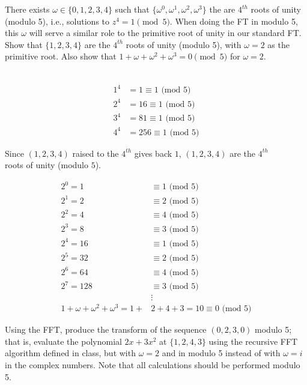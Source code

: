\documentclass[11pt]{article}
\begin{document}
\begin{subparts}
\subpart There exists $\omega \in \{0, 1, 2, 3, 4\}$ such that $\{\omega^0, \omega^1, \omega^2, \omega^3\}$ the are $4^{th}$ roots of unity (modulo 5), i.e., solutions to $z^4 = 1 \pmod 5$. When doing the FT in modulo 5, this $\omega$ will serve a similar role to the primitive root of unity in our standard FT. Show that $\{1,2,3,4\}$ are the $4^{th}$ roots of unity (modulo 5), with $\omega=2$ as the primitive root. Also show that $1+\omega + \omega^2 + \omega^3 = 0 \pmod 5$ for $\omega=2$.\\
\begin{solution}\\
    \begin{align*}
        1^4 &= 1 \equiv 1\text{ (mod } 5)\\
        2^4 &= 16 \equiv 1\text{ (mod } 5)\\
        3^4 &= 81 \equiv 1\text{ (mod } 5)\\
        4^4 &= 256 \equiv 1\text{ (mod } 5)
    \end{align*}
    \begin{center}
        Since $\left(1, 2, 3, 4\right)$ raised to the $4^{th}$ gives back $1$, $(1, 2, 3, 4)$ are the $4^{th}$ \\roots of unity (modulo $5$).
    \end{center}
    \begin{align*}
        2^0 = 1 &\equiv 1\text{ (mod } 5)\\
        2^1 = 2 &\equiv 2\text{ (mod } 5)\\
        2^2 = 4 &\equiv 4\text{ (mod } 5)\\
        2^3 = 8 &\equiv 3\text{ (mod } 5)\\
        2^4 = 16 &\equiv 1\text{ (mod } 5)\\
        2^5 = 32 &\equiv 2\text{ (mod } 5)\\
        2^6 = 64 &\equiv 4\text{ (mod } 5)\\
        2^7 = 128 &\equiv 3\text{ (mod } 5)\\
        &\vdots\\
        1+\omega + \omega^2 + \omega^3 = 1 + &2 + 4 + 3 = 10 \equiv 0\text{ (mod } 5)
    \end{align*}
\end{solution}
\newpage
\subpart Using the FFT, produce the transform of the sequence $(0, 2, 3, 0)$ modulo 5; that is, evaluate the polynomial $2x+3x^2$ at $\{1, 2, 4, 3\}$ using the recursive FFT algorithm defined in class, but with $\omega=2$ and in modulo 5 instead of with $\omega=i$ in the complex numbers. Note that all calculations should be performed modulo 5. 


\end{subparts}
\end{document}
